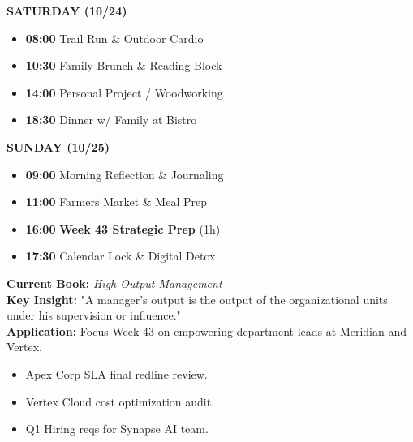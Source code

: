 \documentclass[10pt, landscape]{article}
\begin{document}
\begin{minipage}[t]{0.30\linewidth}

  \begin{tcolorbox}[execbox, title={\faCoffee~ WEEKEND SCHEDULE \& RESTORATION}]
    \textbf{\color{ExecNavy}SATURDAY (10/24)}
    \begin{itemize}[leftmargin=10pt, itemsep=1pt, topsep=1pt]
      \tiny
      \item \textbf{08:00} Trail Run \& Outdoor Cardio
      \item \textbf{10:30} Family Brunch \& Reading Block
      \item \textbf{14:00} Personal Project / Woodworking
      \item \textbf{18:30} Dinner w/ Family at Bistro
    \end{itemize}
    \vspace{2pt}
    \textbf{\color{ExecNavy}SUNDAY (10/25)}
    \begin{itemize}[leftmargin=10pt, itemsep=1pt, topsep=1pt]
      \tiny
      \item \textbf{09:00} Morning Reflection \& Journaling
      \item \textbf{11:00} Farmers Market \& Meal Prep
      \item \textbf{16:00} \textbf{Week 43 Strategic Prep} (1h)
      \item \textbf{17:30} Calendar Lock \& Digital Detox
    \end{itemize}
  \end{tcolorbox}

  \vspace{3pt}

  \begin{tcolorbox}[lightbox, title={\faBookmark~ EXECUTIVE READING \& THOUGHTS}]
    \tiny
    \textbf{Current Book:} \emph{High Output Management}\\
    \textbf{Key Insight:} "A manager's output is the output of the organizational units under his supervision or influence."\\
    \textbf{Application:} Focus Week 43 on empowering department leads at Meridian and Vertex.
  \end{tcolorbox}

  \vspace{3pt}

  \begin{tcolorbox}[execbox, title={\faPaperPlane~ UNFINISHED ITEMS $\rightarrow$ WEEK 43}]
    \begin{itemize}[leftmargin=10pt, itemsep=2pt, topsep=1pt]
      \tiny
      \item [\color{ExecMuted}\faSquare] Apex Corp SLA final redline review.
      \item [\color{ExecMuted}\faSquare] Vertex Cloud cost optimization audit.
      \item [\color{ExecMuted}\faSquare] Q1 Hiring reqs for Synapse AI team.
    \end{itemize}
  \end{tcolorbox}

\end{minipage}
\end{document}
